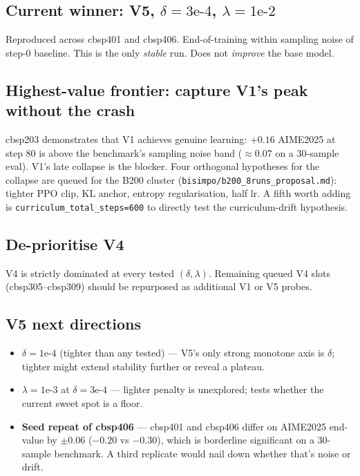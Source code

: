 \documentclass[10pt]{article}
\begin{document}
\subsection{Current winner: V5, $\delta=3\text{e-}4$, $\lambda=1\text{e-}2$}

Reproduced across cbsp401 and cbsp406. End-of-training within sampling
noise of step-0 baseline. This is the only \emph{stable} run. Does
not \emph{improve} the base model.

\subsection{Highest-value frontier: capture V1's peak without the crash}

cbsp203 demonstrates that V1 achieves genuine learning: $+0.16$ AIME2025 at
step 80 is above the benchmark's sampling noise band ($\approx 0.07$
on a 30-sample eval). V1's late collapse is the blocker. Four
orthogonal hypotheses for the collapse are queued for the B200 cluster
(\texttt{bisimpo/b200\_8runs\_proposal.md}): tighter PPO clip, KL
anchor, entropy regularisation, half lr. A fifth worth adding is
\texttt{curriculum\_total\_steps=600} to directly test the
curriculum-drift hypothesis.

\subsection{De-prioritise V4}

V4 is strictly dominated at every tested $(\delta, \lambda)$.
Remaining queued V4 slots (cbsp305--cbsp309) should be repurposed as
additional V1 or V5 probes.

\subsection{V5 next directions}

\begin{itemize}
\item \textbf{$\delta=1\text{e-}4$} (tighter than any tested) ---
  V5's only strong monotone axis is $\delta$; tighter might extend
  stability further or reveal a plateau.
\item \textbf{$\lambda=1\text{e-}3$} at $\delta=3\text{e-}4$ ---
  lighter penalty is unexplored; tests whether the current sweet spot
  is a floor.
\item \textbf{Seed repeat of cbsp406} --- cbsp401 and cbsp406 differ
  on AIME2025 end-value by $\pm 0.06$ ($-0.20$ vs $-0.30$), which is
  borderline significant on a 30-sample benchmark. A third replicate
  would nail down whether that's noise or drift.
\end{itemize}
\end{document}
